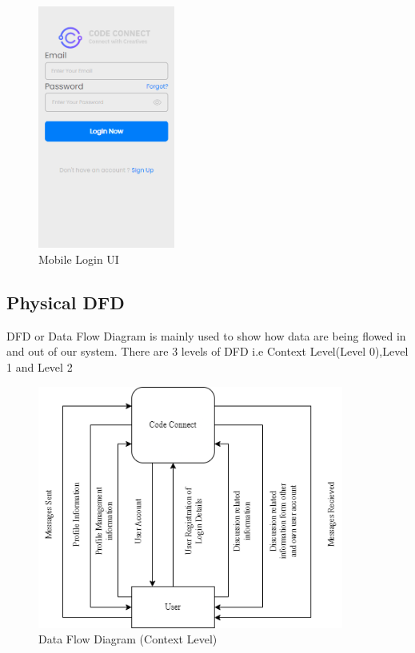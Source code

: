 \begin{figure}[H]
  \centering
  \includegraphics[height = 8cm]{ui_diagrams/mobile_login.png}
  \caption{Mobile Login UI}
\end{figure}
\newpage
\subsection{Physical DFD}
DFD or Data Flow Diagram is mainly used to show how data are being flowed in and out of our system. There are 3 levels of DFD i.e Context Level(Level 0),Level 1 and Level 2
\begin{figure}[H]
    \centering
    \includegraphics[height = 8cm]{Diagrams/DFD.drawio.png}
    \caption{Data Flow Diagram (Context Level)}
\end{figure}
\newpage